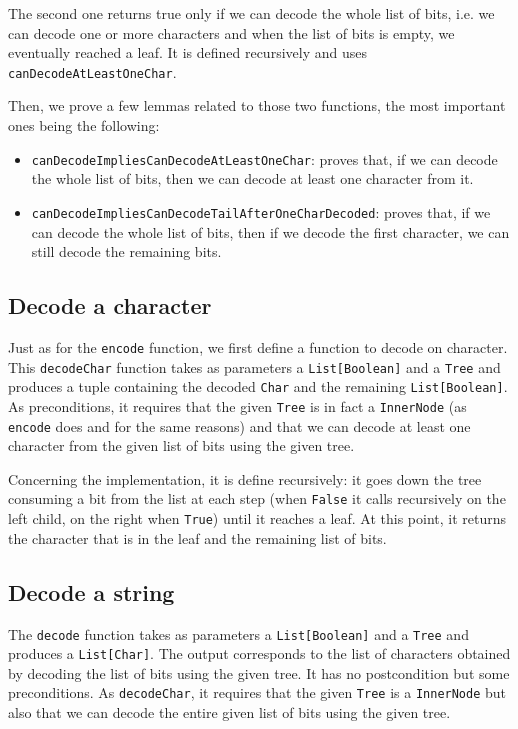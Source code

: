 \documentclass[a4paper,UKenglish,cleveref, autoref, thm-restate]{lipics-v2021}
\begin{document}
\begin{enumerate}
The second one returns true only if we can decode the whole list of bits, i.e. we can decode one or more characters and when the list of bits is empty, we eventually reached a leaf. It is defined recursively and uses \lstinline{canDecodeAtLeastOneChar}.

Then, we prove a few lemmas related to those two functions, the most important ones being the following:
\begin{itemize}
    \item \lstinline{canDecodeImpliesCanDecodeAtLeastOneChar}: proves that, if we can decode the whole list of bits, then we can decode at least one character from it.
    \item \lstinline{canDecodeImpliesCanDecodeTailAfterOneCharDecoded}: proves that, if we can decode the whole list of bits, then if we decode the first character, we can still decode the remaining bits.
\end{itemize}

\subsection{Decode a character}
Just as for the \lstinline{encode} function, we first define a function to decode on character. This \lstinline{decodeChar} function takes as parameters a \lstinline{List[Boolean]} and 
a \lstinline{Tree} and produces a tuple containing the decoded \lstinline{Char} and the remaining \lstinline{List[Boolean]}.
As preconditions, it requires that the given \lstinline{Tree} is in fact a \lstinline{InnerNode} (as \lstinline{encode} does and for the same reasons) and that we can decode at least one character from the given list of bits using the given tree.

Concerning the implementation, it is define recursively: it goes down the tree consuming a bit from the list at each step (when \lstinline{False} it calls recursively on the left child, on the right when \lstinline{True}) until it reaches a leaf. At this point,
it returns the character that is in the leaf and the remaining list of bits.

\subsection{Decode a string}
The \lstinline{decode} function takes as parameters a \lstinline{List[Boolean]} and a \lstinline{Tree} and produces a \lstinline{List[Char]}. The output corresponds to the list of characters obtained by decoding the list of bits using the given tree.
It has no postcondition but some preconditions. As \lstinline{decodeChar}, it requires that the given \lstinline{Tree} is a \lstinline{InnerNode} but also that we can decode the entire given list of bits using the given tree.


\end{enumerate}
\end{document}
